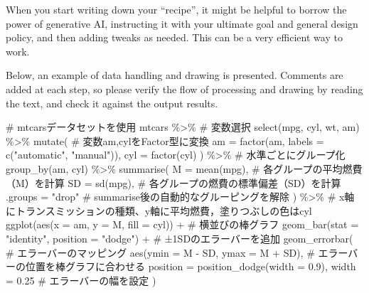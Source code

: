 \documentclass[
  a4paper,
]{book}
\newenvironment{Shaded}{\begin{snugshade}}{\end{snugshade}}
\newcommand{\AttributeTok}[1]{\textcolor[rgb]{0.40,0.45,0.13}{#1}}
\newcommand{\CommentTok}[1]{\textcolor[rgb]{0.37,0.37,0.37}{#1}}
\newcommand{\FloatTok}[1]{\textcolor[rgb]{0.68,0.00,0.00}{#1}}
\newcommand{\FunctionTok}[1]{\textcolor[rgb]{0.28,0.35,0.67}{#1}}
\newcommand{\NormalTok}[1]{\textcolor[rgb]{0.00,0.23,0.31}{#1}}
\newcommand{\SpecialCharTok}[1]{\textcolor[rgb]{0.37,0.37,0.37}{#1}}
\newcommand{\StringTok}[1]{\textcolor[rgb]{0.13,0.47,0.30}{#1}}
\begin{document}
When you start writing down your ``recipe'', it might be helpful to
borrow the power of generative AI, instructing it with your ultimate
goal and general design policy, and then adding tweaks as needed. This
can be a very efficient way to work.

Below, an example of data handling and drawing is presented. Comments
are added at each step, so please verify the flow of processing and
drawing by reading the text, and check it against the output results.

\begin{Shaded}
\begin{Highlighting}[]
\CommentTok{\# mtcarsデータセットを使用}
\NormalTok{mtcars }\SpecialCharTok{\%\textgreater{}\%}
  \CommentTok{\# 変数選択}
  \FunctionTok{select}\NormalTok{(mpg, cyl, wt, am) }\SpecialCharTok{\%\textgreater{}\%}
  \FunctionTok{mutate}\NormalTok{(}
    \CommentTok{\# 変数am,cylをFactor型に変換}
    \AttributeTok{am =} \FunctionTok{factor}\NormalTok{(am, }\AttributeTok{labels =} \FunctionTok{c}\NormalTok{(}\StringTok{"automatic"}\NormalTok{, }\StringTok{"manual"}\NormalTok{)),}
    \AttributeTok{cyl =} \FunctionTok{factor}\NormalTok{(cyl)}
\NormalTok{  ) }\SpecialCharTok{\%\textgreater{}\%}
  \CommentTok{\# 水準ごとにグループ化}
  \FunctionTok{group\_by}\NormalTok{(am, cyl) }\SpecialCharTok{\%\textgreater{}\%}
  \FunctionTok{summarise}\NormalTok{(}
    \AttributeTok{M =} \FunctionTok{mean}\NormalTok{(mpg), }\CommentTok{\# 各グループの平均燃費（M）を計算}
    \AttributeTok{SD =} \FunctionTok{sd}\NormalTok{(mpg), }\CommentTok{\# 各グループの燃費の標準偏差（SD）を計算}
    \AttributeTok{.groups =} \StringTok{"drop"} \CommentTok{\# summarise後の自動的なグルーピングを解除}
\NormalTok{  ) }\SpecialCharTok{\%\textgreater{}\%}
  \CommentTok{\# x軸にトランスミッションの種類、y軸に平均燃費，塗りつぶしの色はcyl}
  \FunctionTok{ggplot}\NormalTok{(}\FunctionTok{aes}\NormalTok{(}\AttributeTok{x =}\NormalTok{ am, }\AttributeTok{y =}\NormalTok{ M, }\AttributeTok{fill =}\NormalTok{ cyl)) }\SpecialCharTok{+}
  \CommentTok{\# 横並びの棒グラフ}
  \FunctionTok{geom\_bar}\NormalTok{(}\AttributeTok{stat =} \StringTok{"identity"}\NormalTok{, }\AttributeTok{position =} \StringTok{"dodge"}\NormalTok{) }\SpecialCharTok{+}
  \CommentTok{\# ±1SDのエラーバーを追加}
  \FunctionTok{geom\_errorbar}\NormalTok{(}
    \CommentTok{\# エラーバーのマッピング}
    \FunctionTok{aes}\NormalTok{(}\AttributeTok{ymin =}\NormalTok{ M }\SpecialCharTok{{-}}\NormalTok{ SD, }\AttributeTok{ymax =}\NormalTok{ M }\SpecialCharTok{+}\NormalTok{ SD),}
    \CommentTok{\# エラーバーの位置を棒グラフに合わせる}
    \AttributeTok{position =} \FunctionTok{position\_dodge}\NormalTok{(}\AttributeTok{width =} \FloatTok{0.9}\NormalTok{),}
    \AttributeTok{width =} \FloatTok{0.25} \CommentTok{\# エラーバーの幅を設定}
\NormalTok{  )}
\end{Highlighting}
\end{Shaded}
\end{document}
